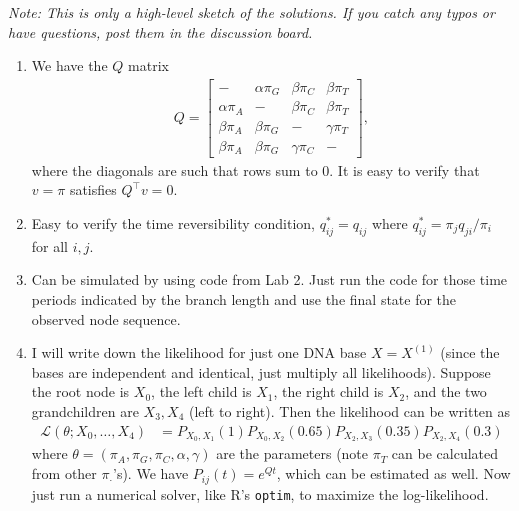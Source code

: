 \documentclass[11pt]{article}
\begin{document}
\begin{center}
  \setlength\fboxsep{0.5cm}
\end{center}

\textit{Note: This is only a high-level sketch of the solutions. If you catch any typos or have questions, post them in the discussion board.}


\begin{enumerate}[label=(\alph*)]

\item We have the $Q$ matrix
\begin{align*}
	Q = \begin{bmatrix}
	- & \alpha \pi_G & \beta \pi_C & \beta \pi_T \\
	\alpha \pi_A & - & \beta \pi_C & \beta \pi_T \\
	\beta \pi_A & \beta \pi_G & - & \gamma \pi_T \\
	\beta \pi_A & \beta \pi_G & \gamma \pi_C & -
	\end{bmatrix},
\end{align*}
where the diagonals are such that rows sum to 0. It is easy to verify that $v = \pi$ satisfies $Q^{\top} v = 0$.

\item Easy to verify the time reversibility condition, $q_{ij}^* = q_{ij}$ where $q_{ij}^* = \pi_j q_{ji} / \pi_i$ for all $i, j$.


\item Can be simulated by using code from Lab 2. Just run the code for those time periods indicated by the branch length and use the final state for the observed node sequence.

\item I will write down the likelihood for just one DNA base $X = X^{(1)}$ (since the bases are independent and identical, just multiply all likelihoods). Suppose the root node is $X_0$, the left child is $X_1$, the right child is $X_2$, and the two grandchildren are $X_3, X_4$ (left to right). Then the likelihood can be written as
\begin{align*}
	\mathcal{L}(\theta; X_0, \dots, X_4) &= P_{X_0, X_1}(1) P_{X_0, X_2}(0.65) P_{X_2, X_3}(0.35) P_{X_2, X_4}(0.3)
\end{align*}
where $\theta = (\pi_A, \pi_G, \pi_C, \alpha, \gamma)$ are the parameters (note $\pi_T$ can be calculated from other $\pi_{\cdot}$'s). We have $P_{ij}(t) = e^{Qt}$, which can be estimated as well. Now just run a numerical solver, like R's \texttt{optim}, to maximize the log-likelihood.


\end{enumerate}
\end{document}
